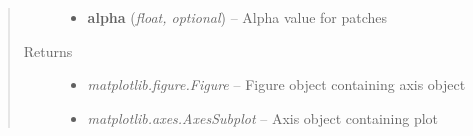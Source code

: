 \documentclass[letterpaper,10pt,english]{sphinxmanual}
\begin{document}
\begin{fulllineitems}
\begin{quote}
\begin{description}
\begin{itemize}
\item {} 
\textbf{alpha} (\emph{float, optional}) -- Alpha value for patches

\end{itemize}

\item[{Returns}] \leavevmode
\begin{itemize}
\item {} 
\emph{matplotlib.figure.Figure} --
Figure object containing axis object

\item {} 
\emph{matplotlib.axes.AxesSubplot} --
Axis object containing plot

\end{itemize}


\end{description}\end{quote}

\end{fulllineitems}

\end{document}
